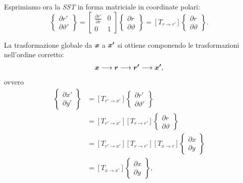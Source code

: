 Esprimiamo ora la \textit{SST} in forma matriciale in coordinate polari:
\begin{equation}
\label{eq:42dtrans}
\left\{\begin{aligned}\partial r' \\ \partial \vartheta' \end{aligned}\right\}
= \left[\begin{array}{cc}\frac{\partial r'}{\partial r} & 0\\0&1\end{array}\right]
\left\{\begin{aligned}\partial r \\ \partial \vartheta \end{aligned}	\right\} = \left[T_{r\rightarrow r'}\right]\left\{\begin{aligned}\partial r \\ \partial \vartheta \end{aligned}	\right\}.
\end{equation}

La trasformazione globale da $\boldsymbol{x}$ a $\boldsymbol{x'}$ si ottiene componendo le trasformazioni nell'ordine corretto:
\begin{equation}
\label{eq:4composizione1}
\boldsymbol{x}\longrightarrow\boldsymbol{r}\longrightarrow\boldsymbol{r'}\longrightarrow\boldsymbol{x'},
\end{equation}
ovvero
\begin{align}
\label{eq:4composizione2}
\left\{\begin{aligned}\partial x'\\ \partial y'\end{aligned}\right\} &= \left[T_{r'\rightarrow x'}\right] \left\{\begin{aligned}\partial r'\\ \partial \vartheta'\end{aligned}\right\}\nonumber\\
&=\left[T_{r'\rightarrow x'}\right] \left[T_{r\rightarrow r'}\right]\left\{\begin{aligned}\partial r\\ \partial \vartheta\end{aligned}\right\}\nonumber\\
&=\left[T_{r'\rightarrow x'}\right] \left[T_{r\rightarrow r'}\right]\left[T_{x\rightarrow r}\right]\left\{\begin{aligned}\partial x\\ \partial y\end{aligned}\right\}\nonumber\\
&=\left[T_{x \rightarrow x'}\right]\left\{\begin{aligned}\partial x\\ \partial y\end{aligned}\right\},
\end{align}

